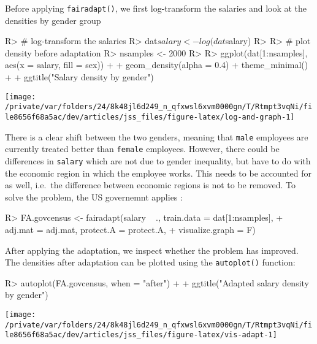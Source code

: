 \documentclass[
  notitle]{jss}
\begin{document}
Before applying \texttt{fairadapt()}, we first log-transform the
salaries and look at the densities by gender group

\begin{CodeChunk}
\begin{CodeInput}
R> # log-transform the salaries
R> dat$salary <- log(dat$salary)
R> 
R> # plot density before adaptation
R> nsamples <- 2000
R> 
R> ggplot(dat[1:nsamples], aes(x = salary, fill = sex)) +
+   geom_density(alpha = 0.4)  + theme_minimal() +
+   ggtitle("Salary density by gender")
\end{CodeInput}


\begin{center}\texttt{[image: /private/var/folders/24/8k48jl6d249\_n\_qfxwsl6xvm0000gn/T/Rtmpt3vqNi/file8656f68a5ac/dev/articles/jss\_files/figure-latex/log-and-graph-1]} \end{center}

\end{CodeChunk}

There is a clear shift between the two genders, meaning that
\texttt{male} employees are currently treated better than
\texttt{female} employees. However, there could be differences in
\texttt{salary} which are not due to gender inequality, but have to do
with the economic region in which the employee works. This needs to be
accounted for as well, i.e.~the difference between economic regions is
not to be removed. To solve the problem, the US governemnt applies
:

\begin{CodeChunk}
\begin{CodeInput}
R> FA.govcensus <- fairadapt(salary ~ ., train.data = dat[1:nsamples],
+                           adj.mat = adj.mat, protect.A = protect.A,
+                           visualize.graph = F)
\end{CodeInput}
\end{CodeChunk}

After applying the adaptation, we inspect whether the problem has
improved. The densities after adaptation can be plotted using the
\texttt{autoplot()} function:

\begin{CodeChunk}
\begin{CodeInput}
R> autoplot(FA.govcensus, when = "after") +
+   ggtitle("Adapted salary density by gender")
\end{CodeInput}


\begin{center}\texttt{[image: /private/var/folders/24/8k48jl6d249\_n\_qfxwsl6xvm0000gn/T/Rtmpt3vqNi/file8656f68a5ac/dev/articles/jss\_files/figure-latex/vis-adapt-1]} \end{center}

\end{CodeChunk}
\end{document}

